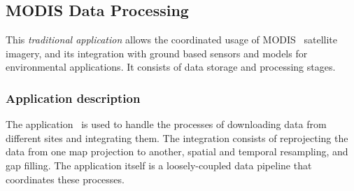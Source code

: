 

\subsection{MODIS Data Processing \label{modisKeith}}

%




This {\em traditional application} allows the coordinated usage of MODIS~\cite{modis}
satellite imagery, and its integration with ground based sensors and models for
environmental applications.  It consists of data storage and processing stages.

\subsubsection*{Application description}


The application~\cite{modisAzure, modis:ipdps:2010} is used to handle the processes of downloading data from different
sites and integrating them. The integration consists of reprojecting the data from one map projection to another,
spatial and temporal resampling, and gap filling. The application itself is a loosely-coupled data
pipeline that coordinates these processes.


